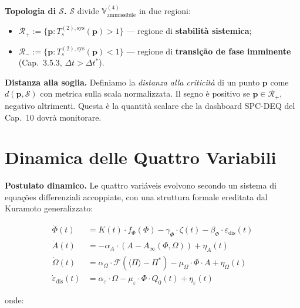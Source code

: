 \Hypoth{} \textbf{Topologia di \(\mathcal{S}\).} \(\mathcal{S}\) divide
\(\mathbb{V}^{(4)}_{\text{ammissibile}}\) in due regioni:

\begin{itemize}
\tightlist
\item
  \(\mathcal{R}_+ := \{\boldsymbol{p} : T_s^{(2),\text{sys}}(\boldsymbol{p}) > 1\}\)
  --- regione di \textbf{stabilità sistemica};
\item
  \(\mathcal{R}_- := \{\boldsymbol{p} : T_s^{(2),\text{sys}}(\boldsymbol{p}) < 1\}\)
  --- regione di \textbf{transição de fase imminente} (Cap.~3.5.3,
  \(\Delta t > \Delta t^*\)).
\end{itemize}

\Hypoth{} \textbf{Distanza alla soglia.} Definiamo la \emph{distanza
alla criticità} di un punto \(\boldsymbol{p}\) come
\(d(\boldsymbol{p}, \mathcal{S})\) con metrica sulla scala normalizzata.
Il segno è positivo se \(\boldsymbol{p} \in \mathcal{R}_+\), negativo
altrimenti. Questa è la quantità scalare che la dashboard SPC-DEQ del
Cap.~10 dovrà monitorare.



\section{Dinamica delle Quattro
Variabili}\label{dinamica-delle-quattro-variáveis}

\Hypoth{} \textbf{Postulato dinamico.} Le quattro variáveis evolvono
secondo un sistema di equações differenziali accoppiate, con una
struttura formale ereditata dal Kuramoto generalizzato:

\[
\begin{aligned}
\dot{\Phi}(t) &= K(t) \cdot f_\Phi(\Phi) - \gamma_\Phi \cdot \zeta(t) - \beta_\Phi \cdot \varepsilon_{\text{dis}}(t) \\
\dot{A}(t) &= -\alpha_A \cdot (A - A_\infty(\Phi, \Omega)) + \eta_A(t) \\
\dot{\Omega}(t) &= \alpha_\Omega \cdot \mathcal{F}(\langle\Pi\rangle - \Pi^*) - \mu_\Omega \cdot \Phi \cdot A + \eta_\Omega(t) \\
\dot{\varepsilon}_{\text{dis}}(t) &= \alpha_\varepsilon \cdot \Omega - \mu_\varepsilon \cdot \Phi \cdot Q_0(t) + \eta_\varepsilon(t)
\end{aligned}
\]

onde:

